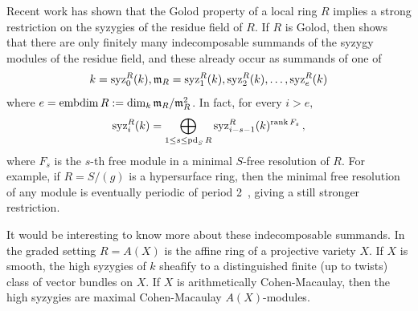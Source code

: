 \documentclass[11pt]{amsart}
\def\gm{{\mathfrak m}}
\DeclareMathOperator\edim{{\rm embdim}}
\begin{document}
Recent work has shown that the Golod property of a local ring $R$ implies a strong restriction on the syzygies of the residue field of $R$.
 If $R$ is Golod, then \cite[Theorem 1.3]{DaoEtAl} shows that there are only finitely many 
indecomposable summands of the syzygy modules of the residue field, and these already occur as summands of one of 
$$
k = \syz_{0}^{R}(k),\gm_{R} = \syz_{1}^{R}(k), \syz_{2}^{R}(k), \dots, \syz_{e}^{R}(k)
$$
where $e = \edim R := \dim_{k}\gm_{R}/\gm_{R}^{2}$. In fact,
for every $i>e,$
$$
\operatorname{syz}^R_i(k)=\bigoplus_{1 \leq s \leq \operatorname{pd}_{S}R} \operatorname{syz}^R_{i-s-1}(k) ^{\operatorname{rank} F_s}\, , 
$$
where $F_{s}$ is the $s$-th free module in a minimal $S$-free resolution of $R$.
For example, if $R = S/(g)$ is a hypersurface ring, then the minimal free resolution of any module is eventually periodic of period 2~\cite{Eisenbud1980}, giving a still stronger restriction.

It would be interesting to know more about these indecomposable summands. In the graded setting $R = A(X)$ is the affine ring of a projective variety $X$. If $X$ is smooth,  the high syzygies of $k$ sheafify to a distinguished finite (up to twists) class of vector bundles on $X$. If $X$ is arithmetically Cohen-Macaulay, then the high syzygies are 
maximal Cohen-Macaulay $A(X)$-modules. 
\end{document}
